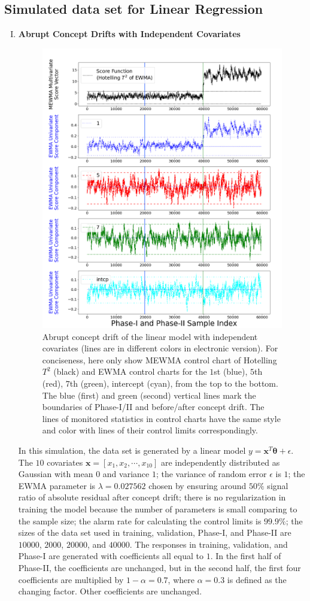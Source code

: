 \documentclass[twoside,11pt]{article}
\begin{document}
\begin{appendix}
\subsection{Simulated data set for Linear Regression}
\label{sss:lin_exp}
\begin{enumerate}[(I)]
\item
\textbf{Abrupt Concept Drifts with Independent Covariates}
\label{ssss:lin_ind_pred}

\begin{figure}[!hpt]
\centering
  \includegraphics[width = 0.6\linewidth]{../figures/v14/sim_2/reg/neg_single_1_sim2_mlines_with_regu_1e-08_0_005.png}
  \caption{Abrupt concept drift of the linear model with independent covariates (lines are in different colors in electronic version). For conciseness, here only show MEWMA control chart of Hotelling $T^2$ (black) and EWMA control charts for the $1$st (blue), $5$th (red), $7$th (green), intercept (cyan), from the top to the bottom. The blue (first) and green (second) vertical lines mark the boundaries of Phase-I/II and before/after concept drift. The lines of monitored statistics in control charts have the same style and color with lines of their control limits correspondingly.}
  \label{fig:lin_reg_ind_X}
\end{figure}
In this simulation, the data set is generated by a {linear} model $y = \bm {x}^T\bm { \theta} + \epsilon$. The $10$ {covariates} {$\bm {x}=[x_1, x_2, \cdots, x _{10}]$} are independently distributed as Gaussian with mean $0$ and variance $1$; the variance of random error $ \epsilon$ is $1$; the EWMA parameter is $\lambda=0.027562$ chosen by ensuring around $50\%$ signal ratio of absolute residual after concept drift; there is no regularization in training the model because the number of parameters is small comparing to the sample size; the alarm rate for calculating the control limits is $99.9\%$; the sizes of the data set used in training, validation, Phase-I, and Phase-II are $10000$, $2000$, $20000$, and $40000$. The responses in training, validation, and Phase-I are generated with coefficients all equal to $1$. In the first half of Phase-II, the coefficients are unchanged, but in the second half, the first four coefficients are multiplied by $1- \alpha=0.7$, where $ \alpha=0.3$ is defined as the changing factor. Other coefficients are unchanged.

\end{enumerate}
\end{appendix}
\end{document}
